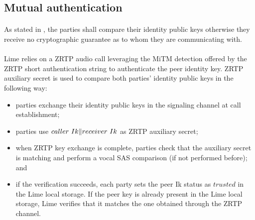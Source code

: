 \documentclass[a4paper,11pt]{article}
\begin{document}
  \subsection{Mutual authentication}
    \label{subsec:mutualauthentication}
    \paragraph{}As stated in \cite[section 4.1]{x3dh}, the parties shall compare their identity public keys otherwise they receive no cryptographic guarantee as to whom they are communicating with.
    \paragraph{}Lime relies on a ZRTP\cite{zrtp} audio call leveraging the MiTM detection offered by the ZRTP short authentication string to authenticate the peer identity key. ZRTP auxiliary secret is used to compare both parties' identity public keys in the following way:
    \begin{itemize}
      \item parties exchange their identity public keys in the signaling channel at call establishment;
      \item parties use $caller\ Ik \Arrowvert receiver\ Ik$ as ZRTP auxiliary secret;
      \item when ZRTP key exchange is complete, parties check that the auxiliary secret is matching and perform a vocal SAS comparison (if not performed before); and
      \item if the verification succeeds, each party sets the peer Ik status as $trusted$ in the Lime local storage. If the peer key is already present in the Lime local storage, Lime verifies that it matches the one obtained through the ZRTP channel.
    \end{itemize}
    
\end{document}
